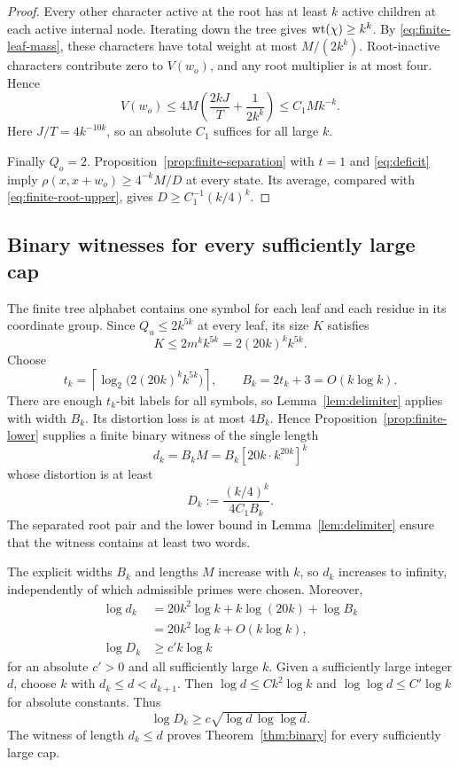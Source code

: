 \begin{proof}
Every other character active at the root has at least $k$ active
children at each active internal node. Iterating down the tree gives
$\operatorname{wt}(\chi)\geq k^k$. By \eqref{eq:finite-leaf-mass}, these characters
have total weight at most $M/(2k^k)$. Root-inactive characters contribute
zero to $V(w_o)$, and any root multiplier is at most four. Hence
\begin{equation}\label{eq:finite-root-upper}
 V(w_o)\leq4M\left(\frac{2kJ}{T}+\frac1{2k^k}\right)
 \leq C_1Mk^{-k}.
\end{equation}
Here $J/T=4k^{-10k}$, so an absolute $C_1$ suffices for all large $k$.

Finally $Q_o=2$. Proposition~\ref{prop:finite-separation} with $t=1$
and \eqref{eq:deficit} imply
$\rho(x,x+w_o)\geq4^{-k}M/D$ at every state. Its average, compared with
\eqref{eq:finite-root-upper}, gives
$D\geq C_1^{-1}(k/4)^k$.
\end{proof}

\subsection{Binary witnesses for every sufficiently large cap}

The finite tree alphabet contains one symbol for each leaf and each
residue in its coordinate group. Since $Q_u\leq2k^{5k}$ at every
leaf, its size $K$ satisfies
\[
 K\leq 2m^k k^{5k}=2(20k)^k k^{5k}.
\]
Choose
\[
 t_k=\left\lceil\log_2\bigl(2(20k)^k k^{5k}\bigr)\right\rceil,
 \qquad B_k=2t_k+3=O(k\log k).
\]
There are enough $t_k$-bit labels for all symbols, so
Lemma~\ref{lem:delimiter} applies with width $B_k$.
Its distortion loss is at most $4B_k$. Hence
Proposition~\ref{prop:finite-lower} supplies a finite binary witness
of the single length
\begin{equation}\label{eq:finite-binary-length}
 d_k=B_kM=B_k[20k\cdot k^{20k}]^k
\end{equation}
whose distortion is at least
\[
 D_k:=\frac{(k/4)^k}{4C_1B_k}.
\]
The separated root pair and the lower bound in
Lemma~\ref{lem:delimiter} ensure that the witness contains at least
two words.

The explicit widths $B_k$ and lengths $M$ increase with $k$, so $d_k$
increases to infinity, independently of which admissible primes were
chosen. Moreover,
\begin{align*}
 \log d_k&=20k^2\log k+k\log(20k)+\log B_k\\
 &=20k^2\log k+O(k\log k),\\
 \log D_k&\geq c'k\log k
\end{align*}
for an absolute $c'>0$ and all sufficiently large $k$.
Given a sufficiently large integer $d$, choose $k$ with
$d_k\leq d<d_{k+1}$. Then
$\log d\leq Ck^2\log k$ and $\log\log d\leq C'\log k$ for absolute
constants. Thus
\[
 \log D_k\geq c\sqrt{\log d\,\log\log d}.
\]
The witness of length $d_k\leq d$ proves
Theorem~\ref{thm:binary} for every sufficiently large cap.
